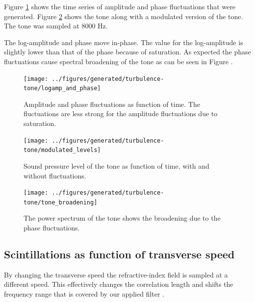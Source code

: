 Figure \ref{fig:results_tone_logamp_and_phase} shows the time series of
amplitude and phase fluctuations that were generated. Figure
\ref{fig:results_tone_levels} shows the tone along with a modulated version of
the tone. The tone was sampled at 8000 Hz.

The log-amplitude and phase move in-phase. The value for the log-amplitude is slightly lower than that of the phase because of saturation.
As expected the phase fluctuations cause spectral broadening of the tone as can be seen in Figure \cite{Ostashev2016}.

\begin{figure}[H]
  \centering
  \texttt{[image: ../figures/generated/turbulence-tone/logamp\_and\_phase]}
  \caption{Amplitude and phase fluctuations as function of time. The fluctuations are less strong for the amplitude fluctuations due to saturation.}
  \label{fig:results_tone_logamp_and_phase}
\end{figure}

\begin{figure}[H]
  \centering
  \texttt{[image: ../figures/generated/turbulence-tone/modulated\_levels]}
  \caption{Sound pressure level of the tone as function of time, with and without fluctuations.}
  \label{fig:results_tone_levels}
\end{figure}



\begin{figure}[H]
  \centering
  \texttt{[image: ../figures/generated/turbulence-tone/tone\_broadening]}
  \caption{The power spectrum of the tone shows the broadening due to the phase fluctuations.}
  \label{fig:results_tone_broadening}
\end{figure}

\subsection{Scintillations as function of transverse speed}
By changing the transverse speed the refractive-index field is sampled at a
different speed. This effectively changes the correlation length and shifts the frequency range that is covered by our applied filter \cite{Wilson1999}.

